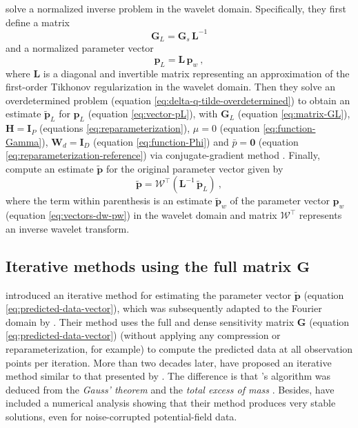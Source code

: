 \citet{li-oldenburg2010} solve a normalized inverse problem in the wavelet domain.
Specifically, they first define a matrix
\begin{equation}
	\mathbf{G}_{L} = \mathbf{G}_{s} \, \mathbf{L}^{-1}
	\label{eq:matrix-GL}
\end{equation}
and a normalized parameter vector 
\begin{equation}
	\mathbf{p}_{L} = \mathbf{L} \, \mathbf{p}_{w} \: ,
	\label{eq:vector-pL}
\end{equation}
where $\mathbf{L}$ is a diagonal and invertible matrix representing an approximation of the 
first-order Tikhonov regularization in the wavelet domain.
Then they solve an overdetermined problem (equation \ref{eq:delta-q-tilde-overdetermined}) 
to obtain an estimate $\tilde{\mathbf{p}}_{L}$ for $\mathbf{p}_{L}$ (equation \ref{eq:vector-pL}), 
with $\mathbf{G}_{L}$ (equation \ref{eq:matrix-GL}), 
$\mathbf{H} = \mathbf{I}_{P}$ (equations \ref{eq:reparameterization}),
$\mu = 0$ (equation \ref{eq:function-Gamma}), 
$\mathbf{W}_{d} = \mathbf{I}_{D}$ (equation \ref{eq:function-Phi}) and 
$\bar{p} = \mathbf{0}$ (equation \ref{eq:reparameterization-reference}) via 
conjugate-gradient method \cite[e.g.,][sec. 11.3]{golub-vanloan2013}.
Finally, \citet{li-oldenburg2010} compute an estimate $\tilde{\mathbf{p}}$ for the original parameter vector given by
\begin{equation}
	\tilde{\mathbf{p}} = \boldsymbol{\mathcal{W}}^{\top} \left( \mathbf{L}^{-1} \, \tilde{\mathbf{p}}_{L} \right) \: ,
	\label{eq:vector-p-tilde-LO10}
\end{equation}
where the term within parenthesis is an estimate $\tilde{\mathbf{p}}_{w}$ of the parameter vector $\mathbf{p}_{w}$
(equation \ref{eq:vectors-dw-pw}) in the wavelet domain and 
matrix $\boldsymbol{\mathcal{W}}^{\top}$ represents an inverse wavelet transform. 

\subsection{Iterative methods using the full matrix $\mathbf{G}$}

\citet{xia-sprowl1991} introduced an iterative method for estimating the parameter vector $\tilde{\mathbf{p}}$ 
(equation \ref{eq:predicted-data-vector}), which was subsequently adapted to the Fourier domain by \citet{xia-etal1993}.
Their method uses the full and dense sensitivity matrix $\mathbf{G}$ (equation \ref{eq:predicted-data-vector})
(without applying any compression or reparameterization, for example) to compute the predicted data
at all observation points per iteration.
More than two decades later, \cite{siqueira-etal2017} have proposed an iterative method similar to that presented by \citet{xia-sprowl1991}.
The difference is that \citeauthor{siqueira-etal2017}'s algorithm was deduced from 
the \textit{Gauss' theorem} \cite[e.g.,][p. 43]{kellogg1967} and the \textit{total excess of mass} \cite[e.g.,][p. 60]{blakely1996}.
Besides, \citet{siqueira-etal2017} have included a numerical analysis showing that their method produces very stable solutions, 
even for noise-corrupted potential-field data.

